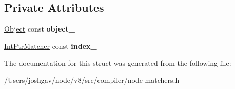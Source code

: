 \subsection*{Private Attributes}
\begin{DoxyCompactItemize}
\item 
\hyperlink{classv8_1_1internal_1_1_object}{Object} const {\bfseries object\+\_\+}\hypertarget{structv8_1_1internal_1_1compiler_1_1_load_matcher_a5deb2acfe6c1aded217fcc7d867fdeb8}{}\label{structv8_1_1internal_1_1compiler_1_1_load_matcher_a5deb2acfe6c1aded217fcc7d867fdeb8}

\item 
\hyperlink{structv8_1_1internal_1_1compiler_1_1_int_matcher}{Int\+Ptr\+Matcher} const {\bfseries index\+\_\+}\hypertarget{structv8_1_1internal_1_1compiler_1_1_load_matcher_a056e90494c5840f2d3df7efd9df8bc8c}{}\label{structv8_1_1internal_1_1compiler_1_1_load_matcher_a056e90494c5840f2d3df7efd9df8bc8c}

\end{DoxyCompactItemize}


The documentation for this struct was generated from the following file\+:\begin{DoxyCompactItemize}
\item 
/\+Users/joshgav/node/v8/src/compiler/node-\/matchers.\+h\end{DoxyCompactItemize}

